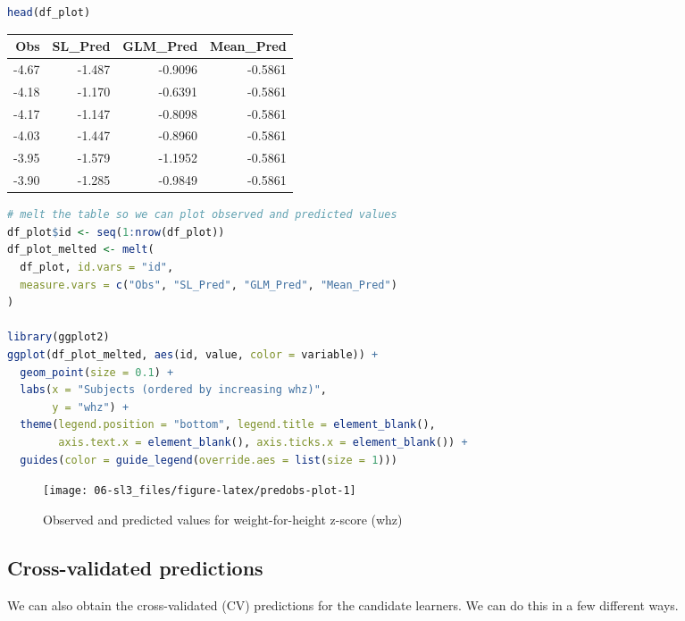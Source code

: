 \documentclass[
  12pt, krantz2,
]{krantz}
\newcommand{\1}{\mathbbm{1}}
\theoremstyle{definition}
\theoremstyle{definition}
\theoremstyle{definition}
\theoremstyle{definition}
\theoremstyle{remark}
\begin{document}
\begin{lstlisting}[language=R]
head(df_plot)
\end{lstlisting}

\begin{tabular}{r|r|r|r}
\hline
Obs & SL\_Pred & GLM\_Pred & Mean\_Pred\\
\hline
-4.67 & -1.487 & -0.9096 & -0.5861\\
\hline
-4.18 & -1.170 & -0.6391 & -0.5861\\
\hline
-4.17 & -1.147 & -0.8098 & -0.5861\\
\hline
-4.03 & -1.447 & -0.8960 & -0.5861\\
\hline
-3.95 & -1.579 & -1.1952 & -0.5861\\
\hline
-3.90 & -1.285 & -0.9849 & -0.5861\\
\hline
\end{tabular}

\begin{lstlisting}[language=R]
# melt the table so we can plot observed and predicted values
df_plot$id <- seq(1:nrow(df_plot))
df_plot_melted <- melt(
  df_plot, id.vars = "id",
  measure.vars = c("Obs", "SL_Pred", "GLM_Pred", "Mean_Pred")
)

library(ggplot2)
ggplot(df_plot_melted, aes(id, value, color = variable)) + 
  geom_point(size = 0.1) + 
  labs(x = "Subjects (ordered by increasing whz)", 
       y = "whz") +
  theme(legend.position = "bottom", legend.title = element_blank(),
        axis.text.x = element_blank(), axis.ticks.x = element_blank()) + 
  guides(color = guide_legend(override.aes = list(size = 1)))
\end{lstlisting}

\begin{figure}

{\centering \texttt{[image: 06-sl3\_files/figure-latex/predobs-plot-1]} 

}

\caption{Observed and predicted values for weight-for-height z-score (whz)}\label{fig:predobs-plot}
\end{figure}

\hypertarget{cross-validated-predictions}{%
\subsection{Cross-validated predictions}\label{cross-validated-predictions}}

We can also obtain the cross-validated (CV) predictions for the candidate
learners. We can do this in a few different ways.
\end{document}
